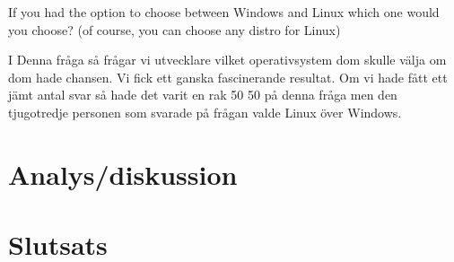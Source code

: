 \documentclass[12pt, a4paper]{report}
\begin{document}
 
   \vspace{1cm}
 
 
   \cite{form}
   \vspace{3cm}
 
   \large{If you had the option to choose between Windows and Linux which one would you choose? (of course, you can choose any distro for Linux)}
  
   \vspace{.5cm}
  
   \normalsize I Denna fråga så frågar vi utvecklare vilket operativsystem dom skulle välja om dom hade chansen. Vi fick ett ganska fascinerande resultat. Om vi hade fått ett jämt antal svar så hade det varit en rak 50 50 på denna fråga men den tjugotredje personen som svarade på frågan valde Linux över Windows.
 
   \vspace{1cm}
 
 
   \cite{form}
 
   \vspace{1cm}

\section{Analys/diskussion}



\section{Slutsats}


\printbibliography
\end{document}
